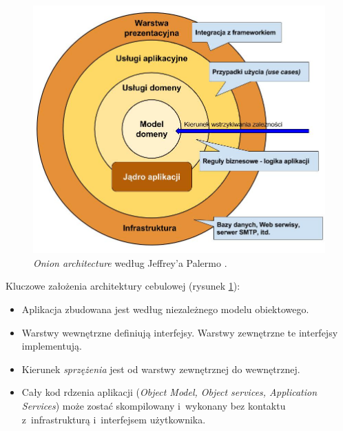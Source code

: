 \begin{figure}[!htb]
    \centering
    \includegraphics[width=12cm]{imgs/ch4_onion_architecture_pl.jpg}
    \caption
{\textit{Onion architecture} według Jeffrey'a Palermo \cite{website:architect:onion}.}
    \label{fig:onion_architecture}
\end{figure} 

Kluczowe założenia architektury cebulowej (rysunek \ref{fig:onion_architecture}):
\begin{itemize}
\item 
Aplikacja zbudowana jest według niezależnego modelu obiektowego.
\item
Warstwy wewnętrzne definiują interfejsy. Warstwy zewnętrzne te interfejsy implementują.
\item
Kierunek \textit{sprzężenia} jest od warstwy zewnętrznej do wewnętrznej.
\item
Cały kod rdzenia aplikacji (\textit{Object Model, Object services, Application Services}) może zostać skompilowany i~wykonany bez kontaktu z~infrastrukturą i~interfejsem użytkownika.
\end{itemize}


